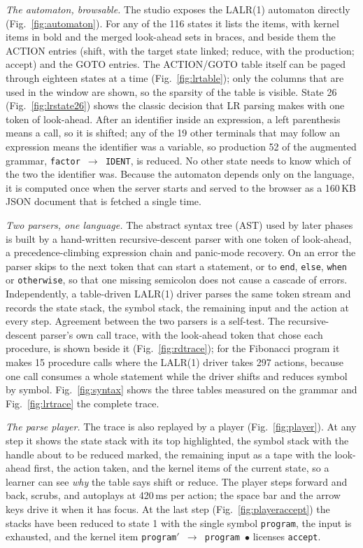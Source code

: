 \documentclass[conference]{IEEEtran}
\newcommand{\code}[1]{\texttt{#1}}
\begin{document}
\emph{The automaton, browsable.} The studio exposes the LALR(1) automaton directly (Fig.~\ref{fig:automaton}). For any of the 116 states it lists the items, with kernel items in bold and the merged look-ahead sets in braces, and beside them the ACTION entries (shift, with the target state linked; reduce, with the production; accept) and the GOTO entries. The ACTION/GOTO table itself can be paged through eighteen states at a time (Fig.~\ref{fig:lrtable}); only the columns that are used in the window are shown, so the sparsity of the table is visible. State 26 (Fig.~\ref{fig:lrstate26}) shows the classic decision that LR parsing makes with one token of look-ahead. After an identifier inside an expression, a left parenthesis means a call, so it is shifted; any of the 19 other terminals that may follow an expression means the identifier was a variable, so production 52 of the augmented grammar, \code{factor $\to$ IDENT}, is reduced. No other state needs to know which of the two the identifier was. Because the automaton depends only on the language, it is computed once when the server starts and served to the browser as a 160\,KB JSON document that is fetched a single time.

\emph{Two parsers, one language.} The abstract syntax tree (AST) used by later phases is built by a hand-written recursive-descent parser with one token of look-ahead, a precedence-climbing expression chain and panic-mode recovery. On an error the parser skips to the next token that can start a statement, or to \code{end}, \code{else}, \code{when} or \code{otherwise}, so that one missing semicolon does not cause a cascade of errors. Independently, a table-driven LALR(1) driver parses the same token stream and records the state stack, the symbol stack, the remaining input and the action at every step. Agreement between the two parsers is a self-test. The recursive-descent parser's own call trace, with the look-ahead token that chose each procedure, is shown beside it (Fig.~\ref{fig:rdtrace}); for the Fibonacci program it makes 15 procedure calls where the LALR(1) driver takes 297 actions, because one call consumes a whole statement while the driver shifts and reduces symbol by symbol. Fig.~\ref{fig:syntax} shows the three tables measured on the grammar and Fig.~\ref{fig:lrtrace} the complete trace.

\emph{The parse player.} The trace is also replayed by a player (Fig.~\ref{fig:player}). At any step it shows the state stack with its top highlighted, the symbol stack with the handle about to be reduced marked, the remaining input as a tape with the look-ahead first, the action taken, and the kernel items of the current state, so a learner can see \emph{why} the table says shift or reduce. The player steps forward and back, scrubs, and autoplays at 420\,ms per action; the space bar and the arrow keys drive it when it has focus. At the last step (Fig.~\ref{fig:playeraccept}) the stacks have been reduced to state 1 with the single symbol \code{program}, the input is exhausted, and the kernel item \code{program$'$ $\to$ program $\bullet$} licenses \code{accept}.
\end{document}
